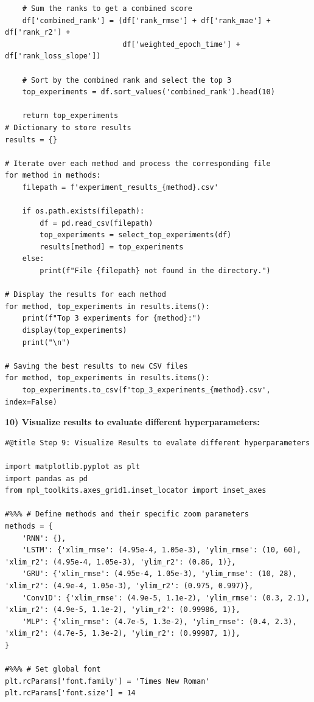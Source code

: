 \documentclass[journal,onecolumn]{IEEEtran}
\begin{document}
{\begin{appendices}
\begin{verbatim}
    # Sum the ranks to get a combined score
    df['combined_rank'] = (df['rank_rmse'] + df['rank_mae'] + df['rank_r2'] +
                           df['weighted_epoch_time'] + df['rank_loss_slope'])
    
    # Sort by the combined rank and select the top 3
    top_experiments = df.sort_values('combined_rank').head(10)
    
    return top_experiments
# Dictionary to store results
results = {}

# Iterate over each method and process the corresponding file
for method in methods:
    filepath = f'experiment_results_{method}.csv'
    
    if os.path.exists(filepath):
        df = pd.read_csv(filepath)
        top_experiments = select_top_experiments(df)
        results[method] = top_experiments
    else:
        print(f"File {filepath} not found in the directory.")

# Display the results for each method
for method, top_experiments in results.items():
    print(f"Top 3 experiments for {method}:")
    display(top_experiments)
    print("\n")

# Saving the best results to new CSV files
for method, top_experiments in results.items():
    top_experiments.to_csv(f'top_3_experiments_{method}.csv', index=False)

\end{verbatim}

\textbf{10) Visualize results to evaluate different hyperparameters: }
\begin{verbatim}
#@title Step 9: Visualize Results to evalate different hyperparameters

import matplotlib.pyplot as plt
import pandas as pd
from mpl_toolkits.axes_grid1.inset_locator import inset_axes

#%%% # Define methods and their specific zoom parameters
methods = {
    'RNN': {},
    'LSTM': {'xlim_rmse': (4.95e-4, 1.05e-3), 'ylim_rmse': (10, 60), 'xlim_r2': (4.95e-4, 1.05e-3), 'ylim_r2': (0.86, 1)},
    'GRU': {'xlim_rmse': (4.95e-4, 1.05e-3), 'ylim_rmse': (10, 28), 'xlim_r2': (4.9e-4, 1.05e-3), 'ylim_r2': (0.975, 0.997)},
    'Conv1D': {'xlim_rmse': (4.9e-5, 1.1e-2), 'ylim_rmse': (0.3, 2.1), 'xlim_r2': (4.9e-5, 1.1e-2), 'ylim_r2': (0.99986, 1)},
    'MLP': {'xlim_rmse': (4.7e-5, 1.3e-2), 'ylim_rmse': (0.4, 2.3), 'xlim_r2': (4.7e-5, 1.3e-2), 'ylim_r2': (0.99987, 1)},
}

#%%% # Set global font
plt.rcParams['font.family'] = 'Times New Roman'
plt.rcParams['font.size'] = 14


\end{verbatim}
\end{appendices}}
\end{document}
